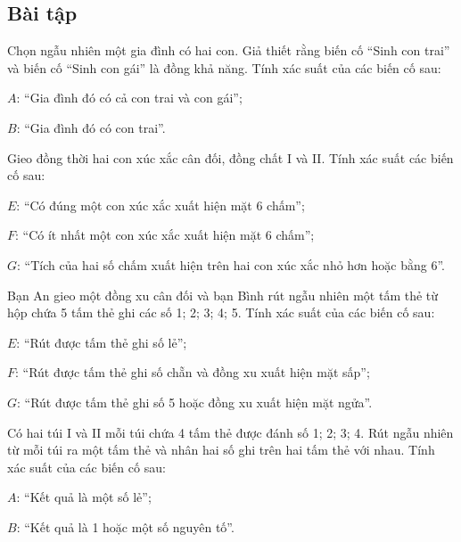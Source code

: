 \begin{exercises}
    \subsection{Bài tập}

    \begin{questions}[resume=SGK]
        \item Chọn ngẫu nhiên một gia đình có hai con. Giả thiết rằng biến cố “Sinh con trai” và biến cố “Sinh con gái” là đồng khả năng. Tính xác suất của các biến cố sau:
        \begin{questions}
            \item $A$: “Gia đình đó có cả con trai và con gái”;
            \item $B$: “Gia đình đó có con trai”.
        \end{questions}

        \answerline
        \answerline

        \item Gieo đồng thời hai con xúc xắc cân đối, đồng chất I và II. Tính xác suất các biến cố sau:

        $E$: “Có đúng một con xúc xắc xuất hiện mặt 6 chấm”;

        $F$: “Có ít nhất một con xúc xắc xuất hiện mặt 6 chấm”;

        $G$: “Tích của hai số chấm xuất hiện trên hai con xúc xắc nhỏ hơn hoặc bằng 6”.

        \answerline
        \answerline

        \item Bạn An gieo một đồng xu cân đối và bạn Bình rút ngẫu nhiên một tấm thẻ từ hộp chứa 5 tấm thẻ ghi các số 1; 2; 3; 4; 5. Tính xác suất của các biến cố sau:

        $E$: “Rút được tấm thẻ ghi số lẻ”;

        $F$: “Rút được tấm thẻ ghi số chẵn và đồng xu xuất hiện mặt sấp”;

        $G$: “Rút được tấm thẻ ghi số 5 hoặc đồng xu xuất hiện mặt ngửa”.

        \answerline
        \answerline

        \item Có hai túi I và II mỗi túi chứa 4 tấm thẻ được đánh số 1; 2; 3; 4. Rút ngẫu nhiên từ mỗi túi ra một tấm thẻ và nhân hai số ghi trên hai tấm thẻ với nhau. Tính xác suất của các biến cố sau:

        $A$: “Kết quả là một số lẻ”;

        $B$: “Kết quả là 1 hoặc một số nguyên tố”.

        \answerline
        \answerline
    \end{questions}
\end{exercises}


